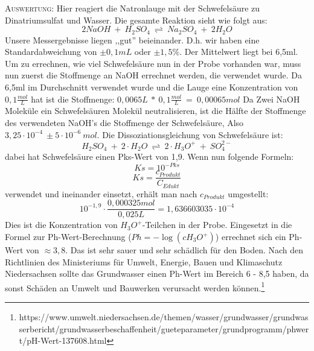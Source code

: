 \documentclass[11pt, a4paper]{article}
\begin{document}
\textsc{Auswertung:}\hspace{8mm} Hier reagiert die Natronlauge mit der Schwefelsäure zu Dinatriumsulfat und Wasser. Die gesamte Reaktion sieht wie folgt aus: $$2NaOH\ +\ H_2SO_4\ \rightleftharpoons\ Na_2SO_4\ +\ 2H_2O$$ Unsere Messergebnisse liegen ,,gut'' beieinander. D.h. wir haben eine Standardabweichung von $\pm 0,1mL$ oder $\pm 1,5\%.$ Der Mittelwert liegt bei 6,5ml. Um zu errechnen, wie viel Schwefelsäure nun in der Probe vorhanden war, muss nun zuerst die Stoffmenge an NaOH errechnet werden, die verwendet wurde. Da 6,5ml im Durchschnitt verwendet wurde und die Lauge eine Konzentration von $0,1 \frac{mol}{L}$ hat ist die Stoffmenge: $0,0065L\ *\ 0,1\frac{mol}{L}\ =\ 0,00065mol$ Da Zwei NaOH Moleküle ein Schwefelsäuren Molekül neutralisieren, ist die Hälfte der Stoffmenge des verwendeten NaOH's die Stoffmenge der Schwefelsäure, Also $3,25\cdot 10^{-4}\ \pm 5\cdot 10^{-6}\ mol$. Die Dissoziationsgleichung von Schwefelsäure ist: $$H_2SO_4\ +\ 2\cdot H_2O\ \rightleftharpoons\ 2\cdot H_3O^+\ +\ SO_4^{2-}$$ dabei hat Schwefelsäure einen Pks-Wert von 1,9. Wenn nun folgende Formeln: $$Ks = 10^{-Pks}$$ $$Ks = \frac{c_{Produkt}}{C_{Edukt}}$$ verwendet und ineinander einsetzt, erhält man nach $c_{Produkt}$ umgestellt: $$10^{-1,9}\cdot\frac{0,000325mol}{0,025L}=1,636603035\cdot 10^{-4}$$ Dies ist die Konzentration von $H_3O^+$-Teilchen in der Probe. Eingesetzt in die Formel zur Ph-Wert-Berechnung ($Ph=-\log (cH_3O^+)$) errechnet sich ein Ph-Wert von $\approx 3,8$. Das ist sehr sauer und sehr schädlich für den Boden. Nach den Richtlinien des Ministeriums für Umwelt, Energie, Bauen und Klimaschutz Niedersachsen sollte das Grundwasser einen Ph-Wert im Bereich 6 - 8,5 haben, da sonst Schäden an Umwelt und Bauwerken verursacht werden können.\footnote{https://www.umwelt.niedersachsen.de/themen/wasser/grundwasser/grundwasserbericht/grundwasserbeschaffenheit/gueteparameter/grundprogramm/phwert/pH-Wert-137608.html}
\end{document}

